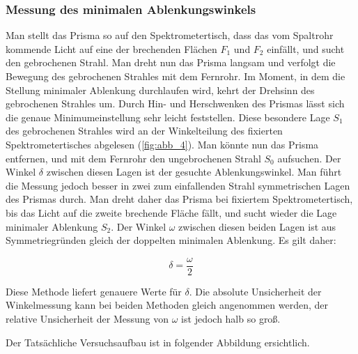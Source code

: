 \documentclass[11pt,ngerman]{scrartcl}
\begin{document}
\subsubsection{Messung des minimalen Ablenkungswinkels}

Man stellt das Prisma so auf den Spektrometertisch, dass das vom Spaltrohr kommende Licht auf
eine der brechenden Flächen $F_1$ und $F_2$ einfällt, und sucht den gebrochenen Strahl. Man dreht
nun das Prisma langsam und verfolgt die Bewegung des gebrochenen Strahles mit dem Fernrohr.
Im Moment, in dem die Stellung minimaler Ablenkung durchlaufen wird, kehrt der Drehsinn
des gebrochenen Strahles um. Durch Hin- und Herschwenken des Prismas lässt sich die genaue
Minimumeinstellung sehr leicht feststellen. Diese besondere Lage $S_1$ des gebrochenen Strahles
wird an der Winkelteilung des fixierten Spektrometertisches abgelesen (\autoref{fig:abb_4}). Man könnte
nun das Prisma entfernen, und mit dem Fernrohr den ungebrochenen Strahl $S_0$ aufsuchen. Der
Winkel $\delta$ zwischen diesen Lagen ist der gesuchte Ablenkungswinkel. Man führt die Messung
jedoch besser in zwei zum einfallenden Strahl symmetrischen Lagen des Prismas durch. Man
dreht daher das Prisma bei fixiertem Spektrometertisch, bis das Licht auf die zweite brechende
Fläche fällt, und sucht wieder die Lage minimaler Ablenkung $S_2$. Der Winkel $\omega$ zwischen diesen
beiden Lagen ist aus Symmetriegründen gleich der doppelten minimalen Ablenkung. Es gilt daher:

\begin{equation}
	\delta = \frac{\omega}{2}
\end{equation}

Diese Methode liefert genauere Werte für $\delta$. Die absolute Unsicherheit der Winkelmessung kann
bei beiden Methoden gleich angenommen werden, der relative Unsicherheit der Messung von $\omega$
ist jedoch halb so groß.

\vspace{2mm}

\newpage

Der Tatsächliche Versuchsaufbau ist in folgender Abbildung ersichtlich.
\end{document}
